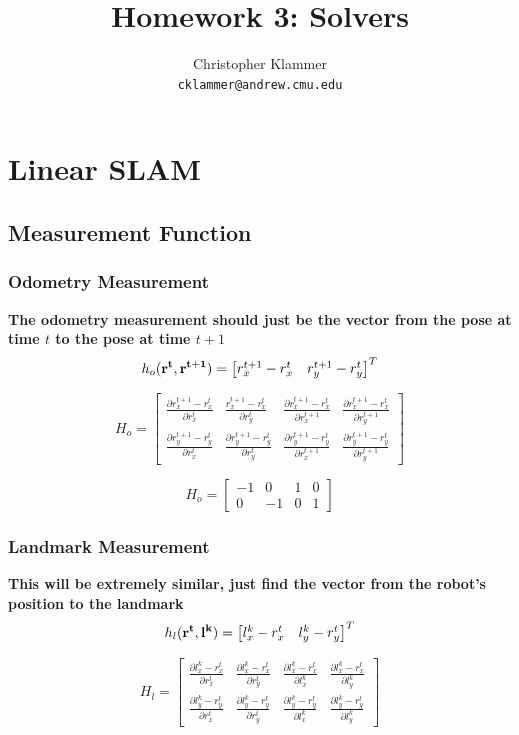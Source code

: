 \documentclass[12pt, a4paper]{article}
\title{Homework 3: Solvers}
\author{Christopher Klammer \\ \small\texttt{cklammer@andrew.cmu.edu}}
\begin{document}
\maketitle
\section{Linear SLAM}
\subsection{Measurement Function}
\subsubsection{Odometry Measurement}
\textbf{The odometry measurement should just be the vector from the pose at time $t$ to the pose at time $t+1$}
$$h_{o}(\vectorbold{r^t}, \vectorbold{r^{t+1}}) = 
\begin{bmatrix} r^{t+1}_x - r^t_x  & r^{t+1}_y - r^t_y \end{bmatrix}^T$$ 

$$H_{o} = \begin{bmatrix}
    \frac{\partial r^{t+1}_x - r^t_x}{\partial r^t_x} & \frac{r^{t+1}_x - r^t_x}{\partial r^t_y}& \frac{\partial r^{t+1}_x - r^t_x}{\partial r^{t+1}_{x}} & \frac{\partial r^{t+1}_x - r^t_x}{\partial r_y^{t+1}} \\
    \frac{\partial r^{t+1}_y - r^t_y}{\partial r^t_x} & \frac{\partial r^{t+1}_y - r^t_y}{\partial r^t_y}& \frac{\partial r^{t+1}_y - r^t_y}{\partial r^{t+1}_{x}} & \frac{\partial r^{t+1}_y - r^t_y}{\partial r_y^{t+1}}
\end{bmatrix}$$

$$H_{o} = \begin{bmatrix}
    -1 & 0 & 1 & 0 \\
    0 & -1 & 0 & 1
\end{bmatrix}$$

\subsubsection{Landmark Measurement}
\textbf{This will be extremely similar, just find the vector from the robot's position to the landmark}
$$h_{l}(\vectorbold{r^t}, \vectorbold{l^k}) = 
\begin{bmatrix} l^k_x - r^t_x  & l^k_y - r^t_y \end{bmatrix}^T$$


$$H_l = \begin{bmatrix}
    \frac{\partial l^k_x - r^t_x}{\partial r^t_x} & \frac{\partial l^k_x - r^t_x}{\partial r^t_y} & \frac{\partial l^k_x - r^t_x}{\partial l^k_x} & \frac{\partial l^k_x - r^t_x}{\partial l^k_y} \\
    \frac{\partial l^k_y - r^t_y }{\partial r^t_x} & \frac{\partial l^k_y - r^t_y }{\partial r^t_y} & \frac{\partial l^k_y - r^t_y }{\partial l^k_x} & \frac{\partial l^k_y - r^t_y }{\partial l^k_y}
\end{bmatrix}$$
\end{document}
